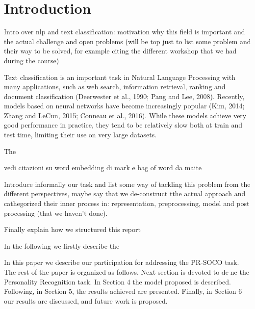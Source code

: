 \section{Introduction} \label{sec:introduction}

Intro over nlp and text classification: motivation why this field is important and the actual challenge and open problems (will be top just to list some problem and their way to be solved, for example citing the different workshop that we had during the course)


Text classification is an important task in Natural Language Processing with many applications, such as web search, information retrieval, ranking and document classification (Deerwester et al., 1990; Pang and Lee, 2008). Recently, models based on neural networks have become increasingly popular (Kim, 2014; Zhang and LeCun, 2015; Conneau et al., 2016). While these models achieve very good performance in practice, they tend to be relatively slow both at train and test time, limiting their use on very large datasets.

The 

vedi citazioni su word embedding di mark e bag of word da maite

Introduce informally our task and list some way of tackling this problem from the different perspectives, maybe say that we de-construct tthe actual approach and cathegorized their inner process in: representation, preprocessing, model and post processing (that we haven't done).

Finally explain how we structured this report

In the following we firstly describe the 

In this paper we describe our participation for addressing
the PR-SOCO task. The rest of the paper is organized as
follows. Next section is devoted to dene the Personality
Recognition task. In Section 4 the model proposed is described.
Following, in Section 5, the results achieved are
presented. Finally, in Section 6 our results are discussed,
and future work is proposed.



